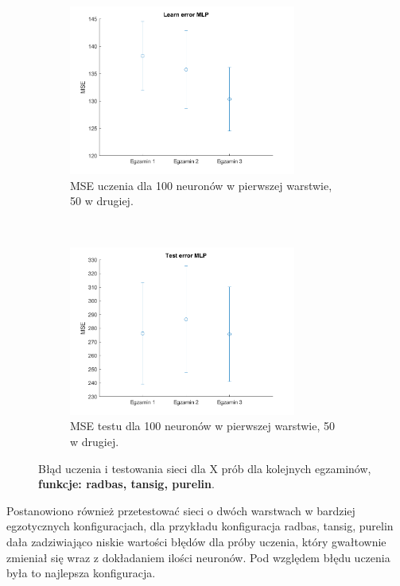 \documentclass[12pt]{article}
\begin{document}
\begin{figure}[H]
\begin{subfigure}[t]{0.48\textwidth} 
\centering
\includegraphics[height=2.2in]{radbas_tansig_purelin50_learn.png}
\caption{MSE uczenia dla  100 neuronów w pierwszej warstwie, 50 w drugiej.}
\end{subfigure}
~~
\begin{subfigure}[t]{0.48\textwidth} 
\centering
\includegraphics[height=2.2in]{radbas_tansig_purelin50_test.png}
\caption{MSE testu dla 100 neuronów w pierwszej warstwie, 50 w drugiej.}
\end{subfigure}

\caption{Błąd uczenia i testowania sieci dla X prób dla kolejnych egzaminów, \textbf{funkcje: radbas, tansig, purelin}.}
\end{figure}

Postanowiono również przetestować sieci o dwóch warstwach w bardziej egzotycznych konfiguracjach, dla przykładu konfiguracja radbas, tansig, purelin dała zadziwiająco niskie wartości błędów dla próby uczenia, który gwałtownie zmieniał się wraz z dokładaniem ilości neuronów. Pod względem błędu uczenia była to najlepsza konfiguracja.
\end{document}
